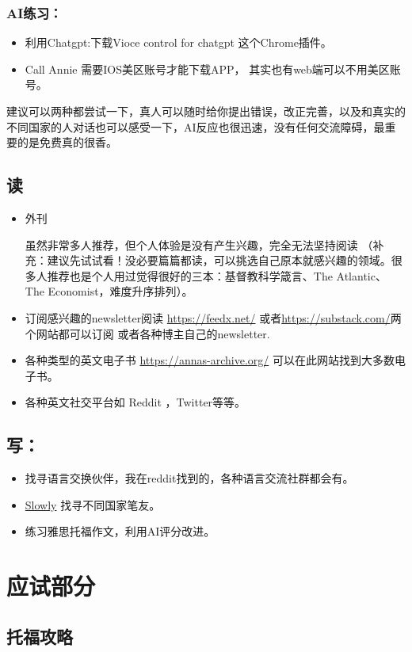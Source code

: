 \documentclass[zihao=-4,fontset=none]{Beautybook-CN}
\begin{document}
\subsubsection{AI练习：}
\begin{itemize}
\item 利用Chatgpt:下载Vioce control for chatgpt  这个Chrome插件。
\item Call Annie 需要IOS美区账号才能下载APP， 其实也有web端可以不用美区账号。
\end{itemize}
\begin{example}
    建议可以两种都尝试一下，真人可以随时给你提出错误，改正完善，以及和真实的不同国家的人对话也可以感受一下，AI反应也很迅速，没有任何交流障碍，最重要的是免费真的很香。
\end{example}
\subsection{读}
\begin{itemize}
\item 外刊

虽然非常多人推荐，但个人体验是没有产生兴趣，完全无法坚持阅读 （补充：建议先试试看！没必要篇篇都读，可以挑选自己原本就感兴趣的领域。很多人推荐也是个人用过觉得很好的三本：基督教科学箴言、The Atlantic、The Economist，难度升序排列）。
\item 订阅感兴趣的newsletter阅读 \url{https://feedx.net/} 或者\url{https://substack.com/}两个网站都可以订阅 或者各种博主自己的newsletter.
\item 各种类型的英文电子书  \url{https://annas-archive.org/} 可以在此网站找到大多数电子书。
\item 各种英文社交平台如 Reddit ，Twitter等等。
\end{itemize}
\subsection{写：}
\begin{itemize}
\item 找寻语言交换伙伴，我在reddit找到的，各种语言交流社群都会有。
\item \href{https://slowly.app/}{Slowly} 找寻不同国家笔友。
\item 练习雅思托福作文，利用AI评分改进。
\end{itemize}
\section{应试部分}
\subsection{托福攻略}
\end{document}
